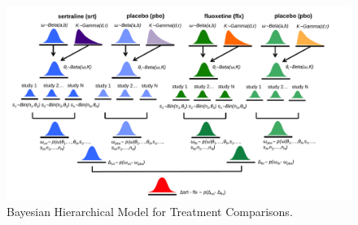 \documentclass{juliacon}
\begin{document}
\begin{figure}[t]
	\centerline{\includegraphics[width=18cm]{bhm_model.pdf}}
	\caption{Bayesian Hierarchical Model for Treatment Comparisons.}
	\label{fig:bhm}
\end{figure}
\end{document}
